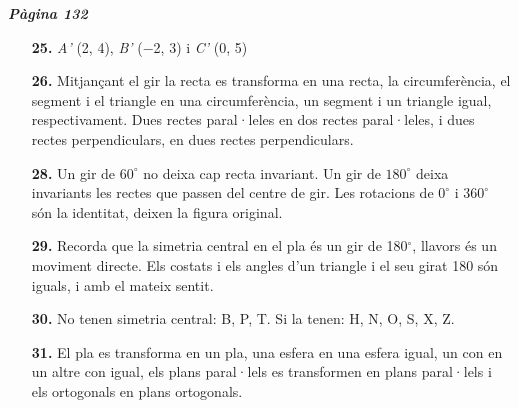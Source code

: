 \documentclass[a4paper, pdf, twoside]{book}
\begin{document}
\begin{multicols}{2}

{\textbf{\em Pàgina 132}} \hrulefill
\begin{enumerate}
\vspace{0.25cm}
\item[\fontfamily{phv}\selectfont\color{blue}\textbf{25. }]  \scalebox{0.6}{\simbolclau } 
\textit {A'} (2, 4), \textit {B'} ($-$2, 3) i \textit {C'} (0, 5)
 \end{enumerate}
\begin{enumerate}
\vspace{0.25cm}
\item[\fontfamily{phv}\selectfont\color{blue}\textbf{26. }] 
 Mitjançant el gir la recta es transforma en una recta, la circumferència, el segment i el triangle en una circumferència, un segment i un triangle igual, respectivament. Dues rectes paral·leles en dos rectes paral·leles, i dues rectes perpendiculars, en dues rectes perpendiculars.
\vspace{0.25cm}
\item[\fontfamily{phv}\selectfont\color{blue}\textbf{28. }]  \scalebox{0.6}{\simbolclau } 
 Un gir de $60^\circ $ no deixa cap recta invariant. Un gir de $180^\circ $ deixa invariants les rectes que passen del centre de gir. Les rotacions de $0^\circ $ i $360^\circ $ són la identitat, deixen la figura original. 
\vspace{0.25cm}
\item[\fontfamily{phv}\selectfont\color{blue}\textbf{29. }] 
Recorda que la simetria central en el pla és un gir de 180$^\circ $, llavors és un moviment directe. Els costats i els angles d'un triangle i el seu girat 180 són iguals, i amb el mateix sentit.
\vspace{0.25cm}
\item[\fontfamily{phv}\selectfont\color{blue}\textbf{30. }] 
No tenen simetria central: B, P, T. Si la tenen: H, N, O, S, X, Z.
\vspace{0.25cm}
\item[\fontfamily{phv}\selectfont\color{blue}\textbf{31. }] 
El pla es transforma en un pla, una esfera en una esfera igual, un con en un altre con igual, els plans paral·lels es transformen en plans paral·lels i els ortogonals en plans ortogonals. 
 \end{enumerate}
\vspace{0.3cm}



\end{multicols}
\end{document}
